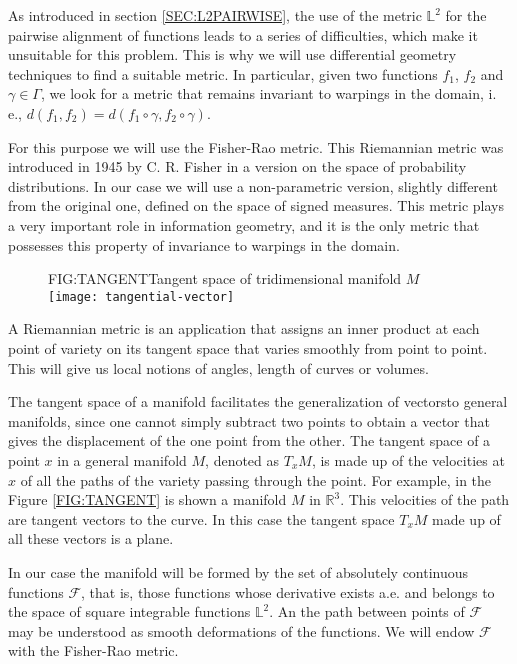 As introduced in section \ref{SEC:L2PAIRWISE}, the use of the metric $\mathbb{L}^2$
for the pairwise alignment of functions leads to a series of difficulties, which make
it unsuitable for this problem. This is why we will use differential
geometry techniques to find a suitable metric. In particular, given two
functions $f_1$, $f_2$ and $\gamma \in \Gamma$, we look for a metric that
remains invariant to warpings in the domain, i. e.,
$d(f_1, f_2) = d(f_1 \circ \gamma, f_2 \circ \gamma)$.

For this purpose we will use the Fisher-Rao metric. This Riemannian metric was
introduced in 1945 by C. R. Fisher in a version on the
space of probability distributions. In our case we will use a non-parametric
version, slightly different from the original one, defined on the space of
signed measures. This metric plays a very important role in information
geometry, and it is the only metric that possesses this property of
invariance to warpings in the domain\cite{Cencov1982}.

\begin{figure}[Tangent space of tridimensional manifold]{FIG:TANGENT}{Tangent space of tridimensional manifold $M$ \footnotemark}
	\texttt{[image: tangential-vector]}
\end{figure}


A Riemannian metric is an application that assigns an inner product at each
point of variety on its tangent space that varies smoothly from point to point.
This will give us local notions of angles, length of curves or volumes.

The tangent space of a manifold facilitates the generalization of
vectorsto general manifolds, since one
cannot simply subtract two points to obtain a vector that gives the displacement
of the one point from the other. The tangent space of a point $x$ in a general
manifold $M$, denoted as $T_xM$, is made up of the velocities at $x$ of all the
paths of the variety passing through the point. For example, in the Figure
\ref{FIG:TANGENT} is shown a manifold $M$ in $\mathbb{R}^3$. This velocities of
the path are tangent vectors to the curve. In this case the tangent space $T_xM$
made up of all these vectors is a plane.



In our case the manifold will be formed by the set of absolutely continuous
functions $\mathcal{F}$, that is, those functions whose derivative exists a.e.
and belongs to the space of square integrable functions $\mathbb{L}^2$. An
the path between points of $\mathcal{F}$ may be understood as smooth
deformations of the functions.
We will endow $\mathcal{F}$ with the Fisher-Rao metric.

